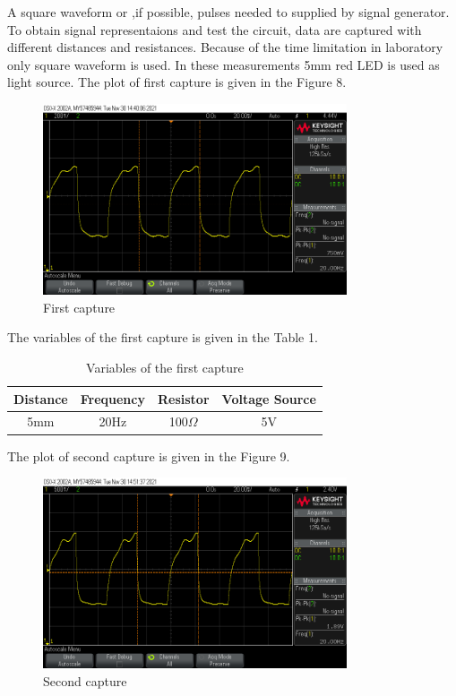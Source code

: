 \documentclass[letterpaper,12pt]{article}
\begin{document}
A square waveform or ,if possible, pulses needed to supplied by signal generator. 
To obtain signal representaions and test the circuit,  data are captured with different distances and resistances. Because of the time limitation in laboratory only square waveform is used. In these measurements 5mm red LED is used as light source.  
The plot of first capture is given in the Figure 8.
\begin{figure}[H]
	\centering
   \includegraphics[width=0.8\textwidth]{capture1_ss 0.png}
   \caption{First capture}
\end{figure} 
The variables of the first capture is given in the Table 1.
\begin{table}[H]
	\begin{center}
		\caption{Variables of the first capture}
		\vspace{2mm}
		\begin{tabular}{||c | c | c | c||} 
		 \hline
		 Distance & Frequency & Resistor & Voltage Source\\ [0.5ex] 
		 \hline\hline
		  5mm & 20Hz &  100\( \Omega \) & 5V  \\ 
		 \hline
		\end{tabular}
	\end{center}
	\end{table}
The plot of second capture is given in the Figure 9.
\begin{figure}[H]
	\centering
   \includegraphics[width=0.8\textwidth]{capture2_ss 0.png}
   \caption{Second capture}
\end{figure} 
\end{document}
